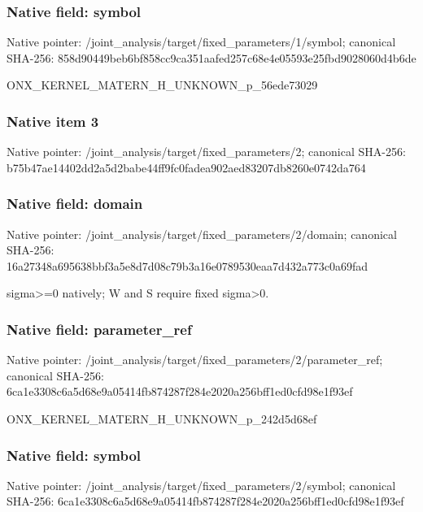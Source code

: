 \documentclass[10pt,a4paper]{article}
\begin{document}
\subsubsection{Native field: symbol}
Native pointer: /joint\_\allowbreak{}analysis/target/fixed\_\allowbreak{}parameters/1/symbol; canonical SHA-256: 858d90449beb6bf858cc9ca351aafed257c68e4e05593e25fbd9028060d4b6de

\begingroup\raggedright\sloppy ONX\_\allowbreak{}KERNEL\_\allowbreak{}MATERN\_\allowbreak{}H\_\allowbreak{}UNKNOWN\_\allowbreak{}p\_\allowbreak{}56ede73029\par\endgroup

\subsubsection{Native item 3}
Native pointer: /joint\_\allowbreak{}analysis/target/fixed\_\allowbreak{}parameters/2; canonical SHA-256: b75b47ae14402dd2a5d2babe44ff9fc0fadea902aed83207db8260e0742da764

\subsubsection{Native field: domain}
Native pointer: /joint\_\allowbreak{}analysis/target/fixed\_\allowbreak{}parameters/2/domain; canonical SHA-256: 16a27348a695638bbf3a5e8d7d08c79b3a16e0789530eaa7d432a773c0a69fad

\begingroup\raggedright\sloppy sigma>=\allowbreak{}0 natively;\allowbreak{} W and S require fixed sigma>0.\par\endgroup

\subsubsection{Native field: parameter\_\allowbreak{}ref}
Native pointer: /joint\_\allowbreak{}analysis/target/fixed\_\allowbreak{}parameters/2/parameter\_\allowbreak{}ref; canonical SHA-256: 6ca1e3308c6a5d68e9a05414fb874287f284e2020a256bff1ed0cfd98e1f93ef

\begingroup\raggedright\sloppy ONX\_\allowbreak{}KERNEL\_\allowbreak{}MATERN\_\allowbreak{}H\_\allowbreak{}UNKNOWN\_\allowbreak{}p\_\allowbreak{}242d5d68ef\par\endgroup

\subsubsection{Native field: symbol}
Native pointer: /joint\_\allowbreak{}analysis/target/fixed\_\allowbreak{}parameters/2/symbol; canonical SHA-256: 6ca1e3308c6a5d68e9a05414fb874287f284e2020a256bff1ed0cfd98e1f93ef
\end{document}
